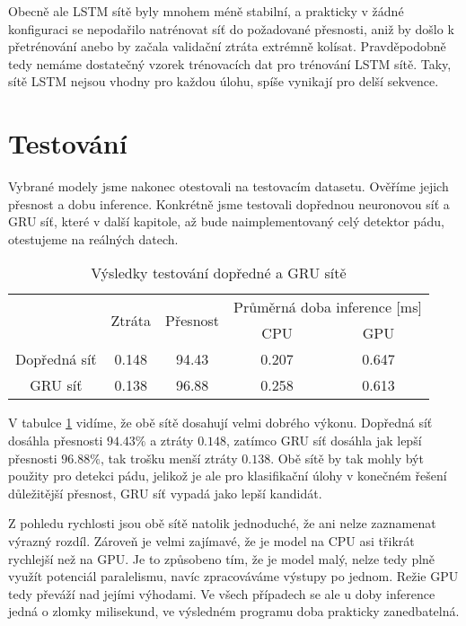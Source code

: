 Obecně ale LSTM sítě byly mnohem méně stabilní, a prakticky v žádné konfiguraci
se nepodařilo natrénovat síť do požadované přesnosti, aniž by došlo k
přetrénování anebo by začala validační ztráta extrémně kolísat. Pravděpodobně
tedy nemáme dostatečný vzorek trénovacích dat pro trénování LSTM sítě. Taky,
sítě LSTM nejsou vhodny pro každou úlohu, spíše vynikají pro delší sekvence.

\section{Testování}
\label{sec:testing}

Vybrané modely jsme nakonec otestovali na testovacím datasetu. Ověříme jejich
přesnost a dobu inference. Konkrétně jsme testovali dopřednou neuronovou síť a
GRU síť, které v další kapitole, až bude naimplementovaný celý detektor pádu,
otestujeme na reálných datech.

\begin{table}[htbp]
    \centering
    \caption{Výsledky testování dopředné a GRU sítě}
    \label{tab:testing}
    \begin{tabular}{|c|c|c|cc|}
        \hline
        \multirow{2}{*}{} & \multirow{2}{*}{Ztráta} & \multirow{2}{*}{Přesnost} & \multicolumn{2}{c|}{Průměrná doba inference [ms]}         \\ \cline{4-5}
                          &                         &                           & \multicolumn{1}{c|}{  CPU  }                      & GPU   \\ \hline
        Dopředná síť      & 0.148                   & 94.43                     & \multicolumn{1}{c|}{0.207}                        & 0.647 \\ \hline
        GRU síť           & 0.138                   & 96.88                     & \multicolumn{1}{c|}{0.258}                        & 0.613 \\ \hline
    \end{tabular}
\end{table}

V tabulce \ref{tab:testing} vidíme, že obě sítě dosahují velmi dobrého výkonu.
Dopředná síť dosáhla přesnosti $94.43\%$ a ztráty $0.148$, zatímco GRU síť
dosáhla jak lepší přesnosti $96.88\%$, tak trošku menší ztráty $0.138$. Obě
sítě by tak mohly být použity pro detekci pádu, jelikož je ale pro klasifikační
úlohy v konečném řešení důležitější přesnost, GRU síť vypadá jako lepší
kandidát.

Z pohledu rychlosti jsou obě sítě natolik jednoduché, že ani nelze zaznamenat
výrazný rozdíl. Zároveň je velmi zajímavé, že je model na CPU asi třikrát
rychlejší než na GPU. Je to způsobeno tím, že je model malý, nelze tedy plně
využít potenciál paralelismu, navíc zpracováváme výstupy po jednom. Režie GPU
tedy převáží nad jejími výhodami. Ve všech případech se ale u doby inference
jedná o zlomky milisekund, ve výsledném programu doba prakticky zanedbatelná.

